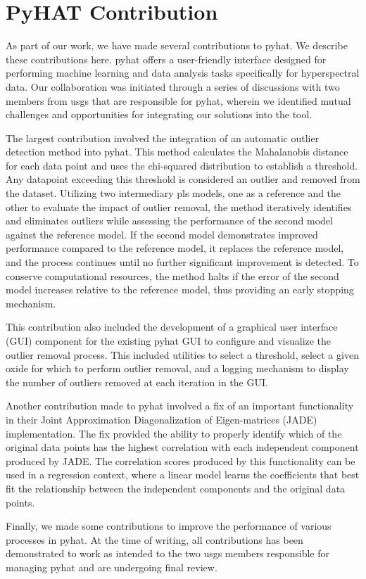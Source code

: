 \section{PyHAT Contribution}\label{sec:pyhat_contribution}
As part of our work, we have made several contributions to \gls{pyhat}. 
We describe these contributions here.
\gls{pyhat} offers a user-friendly interface designed for performing machine learning and data analysis tasks specifically for hyperspectral data.
Our collaboration was initiated through a series of discussions with two members from \gls{usgs} that are responsible for \gls{pyhat}, wherein we identified mutual challenges and opportunities for integrating our solutions into the tool.

The largest contribution involved the integration of an automatic outlier detection method into \gls{pyhat}.
This method calculates the Mahalanobis distance for each data point and uses the chi-squared distribution to establish a threshold.
Any datapoint exceeding this threshold is considered an outlier and removed from the dataset.
Utilizing two intermediary \gls{pls} models, one as a reference and the other to evaluate the impact of outlier removal, the method iteratively identifies and eliminates outliers while assessing the performance of the second model against the reference model. 
If the second model demonstrates improved performance compared to the reference model, it replaces the reference model, and the process continues until no further significant improvement is detected. 
To conserve computational resources, the method halts if the error of the second model increases relative to the reference model, thus providing an early stopping mechanism.

This contribution also included the development of a graphical user interface (GUI) component for the existing \gls{pyhat} GUI to configure and visualize the outlier removal process.
This included utilities to select a threshold, select a given oxide for which to perform outlier removal, and a logging mechanism to display the number of outliers removed at each iteration in the GUI.

Another contribution made to \gls{pyhat} involved a fix of an important functionality in their Joint Approximation Diagonalization of Eigen-matrices (JADE) implementation.
The fix provided the ability to properly identify which of the original data points has the highest correlation with each independent component produced by JADE.
The correlation scores produced by this functionality can be used in a regression context, where a linear model learns the coefficients that best fit the relationship between the independent components and the original data points.

Finally, we made some contributions to improve the performance of various processes in \gls{pyhat}.
At the time of writing, all contributions has been demonstrated to work as intended to the two \gls{usgs} members responsible for managing \gls{pyhat} and are undergoing final review.

 